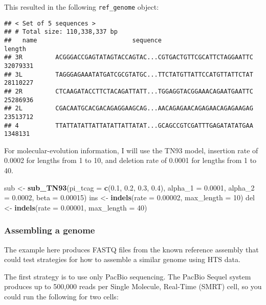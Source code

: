 \documentclass[12pt,]{article}
\newenvironment{Shaded}{\begin{snugshade}}{\end{snugshade}}
\newcommand{\DataTypeTok}[1]{\textcolor[rgb]{0.13,0.29,0.53}{#1}}
\newcommand{\DecValTok}[1]{\textcolor[rgb]{0.00,0.00,0.81}{#1}}
\newcommand{\FloatTok}[1]{\textcolor[rgb]{0.00,0.00,0.81}{#1}}
\newcommand{\KeywordTok}[1]{\textcolor[rgb]{0.13,0.29,0.53}{\textbf{#1}}}
\newcommand{\NormalTok}[1]{#1}
\newcommand{\StringTok}[1]{\textcolor[rgb]{0.31,0.60,0.02}{#1}}
\begin{document}
This resulted in the following \texttt{ref\_genome} object:

\begin{verbatim}
## < Set of 5 sequences >
## # Total size: 110,338,337 bp
##   name                          sequence                             length
## 3R         ACGGGACCGAGTATAGTACCAGTAC...CGTGACTGTTCGCATTCTAGGAATTC  32079331
## 3L         TAGGGAGAAATATGATCGCGTATGC...TTCTATGTTATTCCATGTTATTCTAT  28110227
## 2R         CTCAAGATACCTTCTACAGATTATT...TGGAGGTACGGAAACAGAATGAATTC  25286936
## 2L         CGACAATGCACGACAGAGGAAGCAG...AACAGAGAACAGAGAACAGAGAAGAG  23513712
## 4          TTATTATATTATTATATTATTATAT...GCAGCCGTCGATTTGAGATATATGAA   1348131
\end{verbatim}

For molecular-evolution information, I will use the TN93 model,
insertion rate of 0.0002 for lengths from 1 to 10,
and
deletion rate of 0.0001 for lengths from 1 to 40.

\begin{Shaded}
\begin{Highlighting}[]
\NormalTok{sub <-}\StringTok{ }\KeywordTok{sub_TN93}\NormalTok{(}\DataTypeTok{pi_tcag =} \KeywordTok{c}\NormalTok{(}\FloatTok{0.1}\NormalTok{, }\FloatTok{0.2}\NormalTok{, }\FloatTok{0.3}\NormalTok{, }\FloatTok{0.4}\NormalTok{),}
                \DataTypeTok{alpha_1 =} \FloatTok{0.0001}\NormalTok{,}
                \DataTypeTok{alpha_2 =} \FloatTok{0.0002}\NormalTok{,}
                \DataTypeTok{beta =} \FloatTok{0.00015}\NormalTok{)}
\NormalTok{ins <-}\StringTok{ }\KeywordTok{indels}\NormalTok{(}\DataTypeTok{rate =} \FloatTok{0.00002}\NormalTok{, }
              \DataTypeTok{max_length =} \DecValTok{10}\NormalTok{)}
\NormalTok{del <-}\StringTok{ }\KeywordTok{indels}\NormalTok{(}\DataTypeTok{rate =} \FloatTok{0.00001}\NormalTok{, }
              \DataTypeTok{max_length =} \DecValTok{40}\NormalTok{)}
\end{Highlighting}
\end{Shaded}

\hypertarget{assembling-a-genome}{%
\subsubsection{Assembling a genome}\label{assembling-a-genome}}

The example here produces FASTQ files from the known reference assembly that could
test strategies for how to assemble a similar genome using HTS data.

The first strategy is to use only PacBio sequencing.
The PacBio Sequel system produces up to 500,000 reads per
Single Molecule, Real-Time (SMRT) cell, so you could
run the following for two cells:
\end{document}
